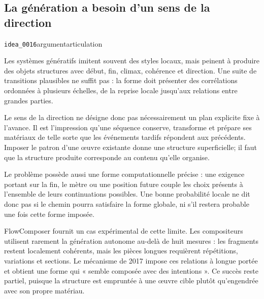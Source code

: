 \documentclass[10pt,a4paper]{article}
\begin{document}
\subsection{La génération a besoin d'un sens de la direction}
{\small\color{metadata} \texttt{idea\_0016}\quad\textbullet\quad argument\quad\textbullet\quad articulation\par}

Les systèmes génératifs imitent souvent des styles locaux, mais peinent à produire des objets structures avec début, fin, climax, cohérence et direction. Une suite de transitions plausibles ne suffit pas : la forme doit présenter des corrélations ordonnées à plusieurs échelles, de la reprise locale jusqu'aux relations entre grandes parties.

Le sens de la direction ne désigne donc pas nécessairement un plan explicite fixe à l'avance. Il est l'impression qu'une séquence conserve, transforme et prépare ses matériaux de telle sorte que les événements tardifs répondent aux précédents. Imposer le patron d'une œuvre existante donne une structure superficielle; il faut que la structure produite corresponde au contenu qu'elle organise.

Le problème possède aussi une forme computationnelle précise : une exigence portant sur la fin, le mètre ou une position future couple les choix présents à l'ensemble de leurs continuations possibles. Une bonne probabilité locale ne dit donc pas si le chemin pourra satisfaire la forme globale, ni s'il restera probable une fois cette forme imposée.

FlowComposer fournit un cas expérimental de cette limite. Les compositeurs utilisent rarement la génération autonome au-delà de huit mesures : les fragments restent localement cohérents, mais les pièces longues requièrent répétitions, variations et sections. Le mécanisme de 2017 impose ces relations à longue portée et obtient une forme qui « semble composée avec des intentions ». Ce succès reste partiel, puisque la structure est empruntée à une œuvre cible plutôt qu'engendrée avec son propre matériau.
\end{document}
